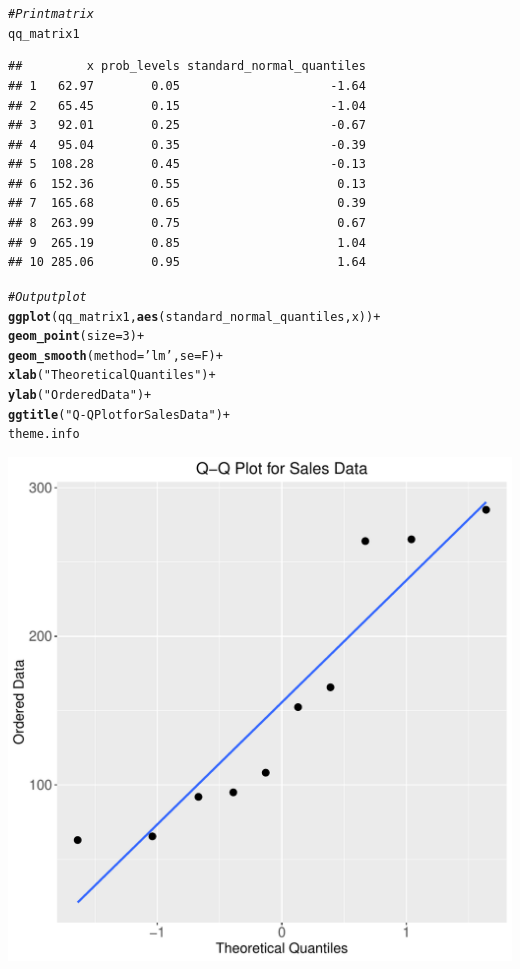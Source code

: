 \documentclass[12pt]{article}\usepackage[]{graphicx}\usepackage[]{color}
\makeatletter
\def\maxwidth{ %
  \ifdim\Gin@nat@width>\linewidth
    \linewidth
  \else
    \Gin@nat@width
  \fi
}
\newcommand{\hlnum}[1]{\textcolor[rgb]{0.686,0.059,0.569}{#1}}%
\newcommand{\hlstr}[1]{\textcolor[rgb]{0.192,0.494,0.8}{#1}}%
\newcommand{\hlcom}[1]{\textcolor[rgb]{0.678,0.584,0.686}{\textit{#1}}}%
\newcommand{\hlopt}[1]{\textcolor[rgb]{0,0,0}{#1}}%
\newcommand{\hlstd}[1]{\textcolor[rgb]{0.345,0.345,0.345}{#1}}%
\newcommand{\hlkwc}[1]{\textcolor[rgb]{0.333,0.667,0.333}{#1}}%
\newcommand{\hlkwd}[1]{\textcolor[rgb]{0.737,0.353,0.396}{\textbf{#1}}}%
\newenvironment{kframe}{%
 \def\at@end@of@kframe{}%
 \ifinner\ifhmode%
  \def\at@end@of@kframe{\end{minipage}}%
  \begin{minipage}{\columnwidth}%
 \fi\fi%
 \def\FrameCommand##1{\hskip\@totalleftmargin \hskip-\fboxsep
 \colorbox{shadecolor}{##1}\hskip-\fboxsep
     \hskip-\linewidth \hskip-\@totalleftmargin \hskip\columnwidth}%
 \MakeFramed {\advance\hsize-\width
   \@totalleftmargin\z@ \linewidth\hsize
   \@setminipage}}%
 {\par\unskip\endMakeFramed%
 \at@end@of@kframe}
\newenvironment{knitrout}{}{} %
\makeatother
\begin{document}
\begin{enumerate}[a)]
\begin{knitrout}
\begin{kframe}
\begin{alltt}
\hlcom{#Print matrix}
\hlstd{qq_matrix1}
\end{alltt}
\begin{verbatim}
##         x prob_levels standard_normal_quantiles
## 1   62.97        0.05                     -1.64
## 2   65.45        0.15                     -1.04
## 3   92.01        0.25                     -0.67
## 4   95.04        0.35                     -0.39
## 5  108.28        0.45                     -0.13
## 6  152.36        0.55                      0.13
## 7  165.68        0.65                      0.39
## 8  263.99        0.75                      0.67
## 9  265.19        0.85                      1.04
## 10 285.06        0.95                      1.64
\end{verbatim}
\begin{alltt}
\hlcom{#Output plot}
\hlkwd{ggplot}\hlstd{(qq_matrix1,} \hlkwd{aes}\hlstd{(standard_normal_quantiles, x))} \hlopt{+}
  \hlkwd{geom_point}\hlstd{(}\hlkwc{size}\hlstd{=}\hlnum{3}\hlstd{)} \hlopt{+}
  \hlkwd{geom_smooth}\hlstd{(}\hlkwc{method}\hlstd{=}\hlstr{'lm'}\hlstd{,} \hlkwc{se}\hlstd{=F)} \hlopt{+}
  \hlkwd{xlab}\hlstd{(}\hlstr{"Theoretical Quantiles"}\hlstd{)} \hlopt{+}
  \hlkwd{ylab}\hlstd{(}\hlstr{"Ordered Data"}\hlstd{)} \hlopt{+}
  \hlkwd{ggtitle}\hlstd{(}\hlstr{"Q-Q Plot for Sales Data"}\hlstd{)} \hlopt{+}
  \hlstd{theme.info}
\end{alltt}
\end{kframe}
\includegraphics[width=\maxwidth]{figure/unnamed-chunk-5-1} 


\end{knitrout}
\end{enumerate}
\end{document}
